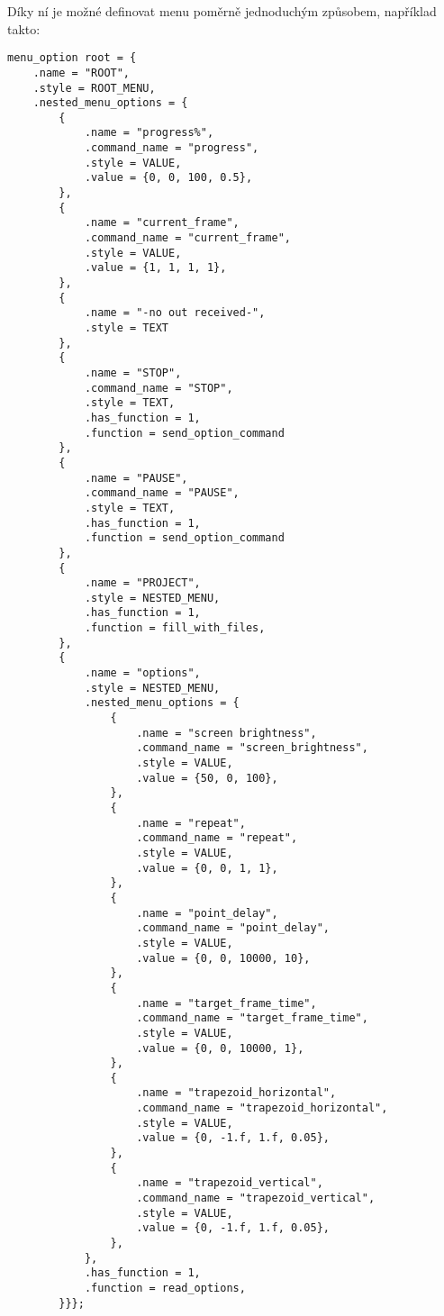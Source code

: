 Díky ní je možné definovat menu poměrně jednoduchým způsobem, například takto:

\begin{verbatim}
menu_option root = {
    .name = "ROOT",
    .style = ROOT_MENU,
    .nested_menu_options = {
        {
            .name = "progress%",
            .command_name = "progress",
            .style = VALUE,
            .value = {0, 0, 100, 0.5},
        },
        {
            .name = "current_frame",
            .command_name = "current_frame",
            .style = VALUE,
            .value = {1, 1, 1, 1},
        },
        {
            .name = "-no out received-",
            .style = TEXT
        },
        {
            .name = "STOP",
            .command_name = "STOP",
            .style = TEXT,
            .has_function = 1,
            .function = send_option_command
        },
        {
            .name = "PAUSE",
            .command_name = "PAUSE",
            .style = TEXT,
            .has_function = 1,
            .function = send_option_command
        },
        {
            .name = "PROJECT",
            .style = NESTED_MENU,
            .has_function = 1,
            .function = fill_with_files,
        },
        {
            .name = "options",
            .style = NESTED_MENU,
            .nested_menu_options = {
                {
                    .name = "screen brightness",
                    .command_name = "screen_brightness",
                    .style = VALUE,
                    .value = {50, 0, 100},
                },
                {
                    .name = "repeat",
                    .command_name = "repeat",
                    .style = VALUE,
                    .value = {0, 0, 1, 1},
                },
                {
                    .name = "point_delay",
                    .command_name = "point_delay",
                    .style = VALUE,
                    .value = {0, 0, 10000, 10},
                },
                {
                    .name = "target_frame_time",
                    .command_name = "target_frame_time",
                    .style = VALUE,
                    .value = {0, 0, 10000, 1},
                },
                {
                    .name = "trapezoid_horizontal",
                    .command_name = "trapezoid_horizontal",
                    .style = VALUE,
                    .value = {0, -1.f, 1.f, 0.05},
                },
                {
                    .name = "trapezoid_vertical",
                    .command_name = "trapezoid_vertical",
                    .style = VALUE,
                    .value = {0, -1.f, 1.f, 0.05},
                },
            },
            .has_function = 1,
            .function = read_options,
        }}};
\end{verbatim}

